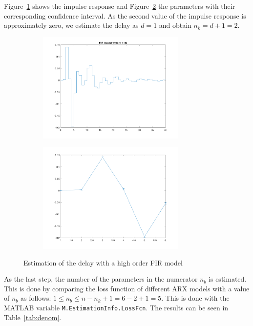 \documentclass{scrartcl}
\begin{document}
Figure~\ref{fig:fir40} shows the impulse response and Figure~\ref{fig:fir40_dev} the parameters with their corresponding confidence interval. As the second value of the impulse response is approximately zero, we estimate the delay as $d=1$ and obtain $n_k = d + 1 = 2$. 

\begin{figure}[h]
	\centering
	\begin{subfigure}{.49\textwidth}
		\includegraphics[height=5.5cm]{figures/fir40.png}
		\label{fig:fir40}
	\end{subfigure}\hfill
	\begin{subfigure}{.49\textwidth}
		\includegraphics[height=5.5cm]{figures/fir40_dev.png}
		\label{fig:fir40_dev}
	\end{subfigure}
	\caption{Estimation of the delay with a high order FIR model}
	\label{fig:delay}
\end{figure}

As the last step, the number of the parameters in the numerator $n_b$ is estimated. This is done by comparing the loss function of different ARX models with a value of $n_b$ as follows: $1 \leq n_b \leq n  - n_k + 1 = 6 - 2 + 1 = 5$. This is done with the MATLAB variable \texttt{M.EstimationInfo.LossFcn}. The results can be seen in Table~\ref{tab:denom}.
\end{document}
